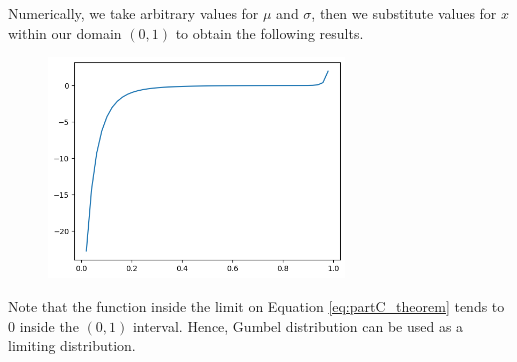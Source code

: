 Numerically, we take arbitrary values for $\mu$ and $\sigma$, then we substitute values for $x$ within our domain $(0,1)$ to obtain the following results.

\begin{figure}[htbp!]
\centering
\includegraphics[width=0.7\textwidth]{images/th1052_gumbel_verify.png}
\label{fig:gumbel_verify}
\end{figure}

Note that the function inside the limit on Equation \ref{eq:partC_theorem} tends to $0$ inside the $(0,1)$ interval. Hence, Gumbel distribution can be used as a limiting distribution.